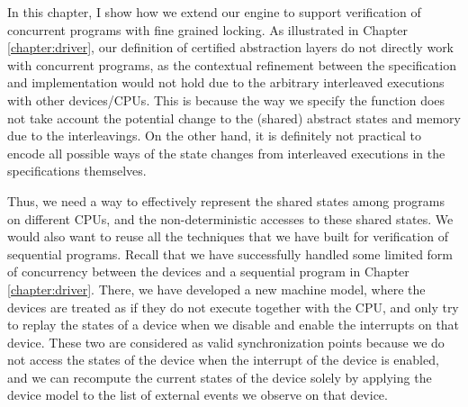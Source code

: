 
In this chapter, I show how we extend our engine to support
verification of concurrent programs with fine grained locking.
As illustrated in Chapter \ref{chapter:driver}, our definition of
certified abstraction layers do not directly work with concurrent programs,
as the contextual refinement between the specification and implementation
would not hold due to the arbitrary interleaved executions with other
devices/CPUs. This is because the way we specify the function
does not take account the potential change to the (shared) abstract states
and memory due to the interleavings. On the other hand, it is definitely
not practical to encode all possible ways of the state changes from
interleaved executions in the specifications themselves.

Thus, we need a way to effectively represent the shared states among programs
on different CPUs, and the non-deterministic accesses to these shared
states. We would also want to reuse all the techniques
that we have built for verification of sequential programs.
Recall that we have successfully handled some limited form of concurrency
between the devices and a sequential program in Chapter \ref{chapter:driver}.
There, we have developed a new machine model, where the devices are treated
as if they do not execute together with the CPU, and only try to replay
the states of a device when we disable and enable the interrupts on that
device. These two are considered as valid synchronization points because
we do not access the states of the device when the interrupt of the device
is enabled, and we can recompute the current states of the device solely by
applying the device model to the list of external events we observe on that device.

